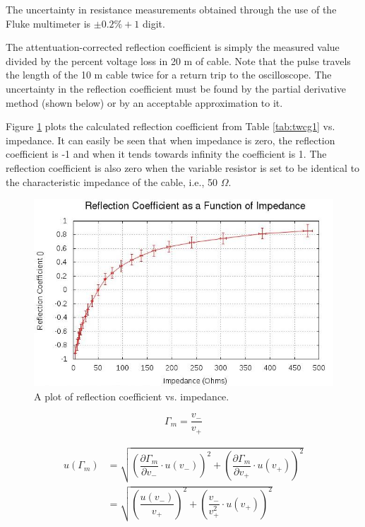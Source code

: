 \begin{enumerate}
The uncertainty in resistance measurements obtained through the use of the Fluke multimeter is $\pm0.2\%+ 1$ digit.

The attentuation-corrected reflection coefficient is simply the measured value divided by the percent voltage loss in 20 m of cable. Note that the pulse travels the length of the 10 m cable twice for a return trip to the oscilloscope. The uncertainty in the reflection coefficient must be found by the partial derivative method (shown below) or by an acceptable approximation to it.

Figure \ref{fig:twcg5} plots the calculated reflection coefficient from Table \ref{tab:twcg1} vs. impedance. It can easily be seen that when impedance is zero, the reflection coefficient is -1 and when it tends towards infinity the coefficient is 1. The reflection coefficient is also zero when the variable resistor is set to be identical to the characteristic impedance of the cable, i.e., 50 $\Omega$.

\begin{figure}
\includegraphics{VarResistor.jpg}
\caption{A plot of reflection coefficient vs. impedance.}
\label{fig:twcg5}
\end{figure}

\begin{equation}
\Gamma_m=\dfrac{v_-}{v_+}
\label{equ:twcg1}
\end{equation}

\begin{align}
u(\Gamma_m)&=\sqrt{(\dfrac{\partial \Gamma_m}{\partial v_-}\cdot u(v_-))^2+(\dfrac{\partial \Gamma_m}{\partial v_+}\cdot u(v_+))^2}\\
&=\sqrt{(\dfrac{u(v_-)}{v_+})^2+(\dfrac{v_-}{v_+^2}\cdot u(v_+))^2}
\label{equ:twcg2}
\end{align}


\end{enumerate}
